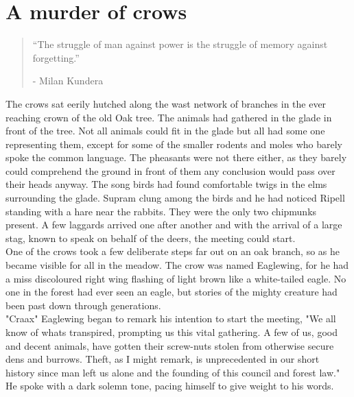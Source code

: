 \documentclass[smalldemyvopaper,11pt,twoside,onecolumn,openright,extrafontsizes]{memoir}
\begin{document}
\chapter{A murder of crows}

\vspace{-1.3cm}
\begin{localsize}{10}
	\begin{quote}
		“The struggle of man against power is the struggle of memory against forgetting.”
		\begin{flushright}- Milan Kundera \end{flushright}
	\end{quote} 
\end{localsize}
\vspace{1cm}

The crows sat eerily hutched along the wast network of branches in the ever reaching crown of the old Oak tree. The animals had gathered in the glade in front of the tree. Not all animals could fit in the glade but all had some one representing them, except for some of the smaller rodents and moles who barely spoke the common language. The pheasants were not there either, as they barely could comprehend the ground in front of them any conclusion would pass over their heads anyway. The song birds had found comfortable twigs in the elms surrounding the glade. Supram clung among the birds and he had noticed Ripell standing with a hare near the rabbits. They were the only two chipmunks present. A few laggards arrived one after another and with the arrival of a large stag, known to speak on behalf of the deers, the meeting could start. \\

One of the crows took a few deliberate steps far out on an oak branch, so as he became visible for all in the meadow. The crow was named Eaglewing, for he had a miss discoloured right wing flashing of light brown like a white-tailed eagle. No one in the forest had ever seen an eagle, but stories of the mighty creature had been past down through generations.\\

"Craax" Eaglewing began to remark his intention to start the meeting, "We all know of whats transpired, prompting us this vital gathering. A few of us, good and decent animals, have gotten their screw-nuts stolen from otherwise secure dens and burrows. Theft, as I might remark, is unprecedented in our short history since man left us alone and the founding of this council and forest law." He spoke with a dark solemn tone, pacing himself to give weight to his words.
\end{document}
